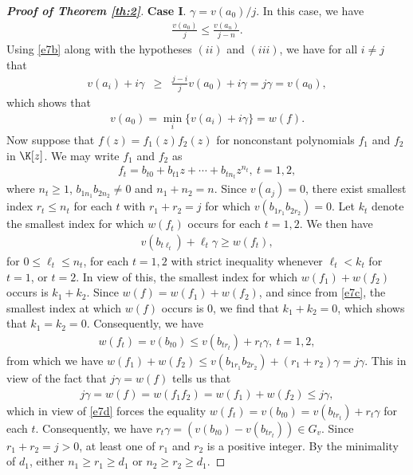 \documentclass[12pt]{amsart}%
\begin{document}
\begin{proof}[\bf Proof of Theorem \ref{th:2}]
\textbf{Case I}. $\gamma={v(a_0)}/{j}$. In this case, we have
\begin{eqnarray}\label{e7b}
\frac{v(a_0)}{j} \leq \frac{v(a_n)}{j-n}.
\end{eqnarray}
Using \eqref{e7b} along with the hypotheses $(ii)$ and $(iii)$, we have for all $i\neq j$ that
\begin{eqnarray*}
v(a_i)+i\gamma&\geq & \frac{j-i}{j}v(a_0)+i\gamma=j\gamma =v(a_0),
\end{eqnarray*}
which shows that
\begin{eqnarray}\label{e7c}
v(a_0)=\min_i\{v(a_i)+i\gamma\}=w(f).
\end{eqnarray}
Now suppose that $f(z)=f_1(z)f_2(z)$
for nonconstant polynomials $f_1$ and $f_2$ in $\K[z]$. We may write $f_1$ and $f_2$ as
\begin{eqnarray*}
f_{t}=b_{t0}+b_{t1}z+\cdots+b_{tn_t}z^{n_t},~t=1,2,
\end{eqnarray*}
where $n_t\geq 1$, $b_{1n_1}b_{2n_2}\neq 0$ and $n_1+n_2=n$. Since $v(a_j)=0$, there exist smallest index $r_t\leq n_t$ for each $t$ with $r_1+r_2=j$ for which $v(b_{1r_1}b_{2r_2})=0$. Let $k_t$ denote the smallest index for which $w(f_t)$ occurs for each $t=1,2$.  We then have
\begin{eqnarray*}
v(b_{t\ell_t})+\ell_t\gamma\geq w(f_t),
\end{eqnarray*}
for $0\leq \ell_t \leq n_t$, for each $t=1,2$ with strict inequality whenever $\ell_t<k_t$ for  $t=1$, or $t=2$. In view of this, the smallest index for which $w(f_1)+w(f_2)$ occurs is $k_1+k_2$. Since $w(f)=w(f_1)+w(f_2)$, and since from \eqref{e7c}, the smallest index at which $w(f)$ occurs is $0$, we find that $k_1+k_2=0$, which shows that $k_1=k_2=0$. Consequently, we have
\begin{eqnarray}\label{e7d}
w(f_t)=v(b_{t0})\leq v(b_{tr_t})+r_t\gamma,~t=1,2,
\end{eqnarray}
from which we have $w(f_1)+w(f_2)\leq v(b_{1r_1}b_{2r_2})+(r_1+r_2)\gamma=j\gamma$. This in view of the fact that $j\gamma=w(f)$ tells us that
\begin{eqnarray*}
j\gamma=w(f)=w(f_1f_2)= w(f_1)+w(f_2) \leq j\gamma,
\end{eqnarray*}
which in view of \eqref{e7d} forces the equality $w(f_t)=v(b_{t0})=v(b_{tr_t})+r_t\gamma$ for each $t$. Consequently,  we have $r_t\gamma=(v(b_{t0})-v(b_{tr_t})) \in G_v$. Since $r_1+r_2=j>0$, at least one of $r_1$ and $r_2$ is a positive integer. By the minimality of $d_1$, either $n_1\geq r_1\geq d_1$ or $n_2\geq r_2\geq d_1$.
	

\end{proof}
\end{document}
